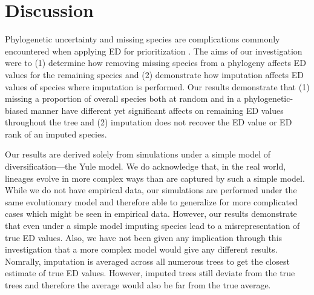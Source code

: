 \documentclass[12pt,english]{article}
\begin{document}
\section*{Discussion}
Phylogenetic uncertainty and missing species are complications commonly
encountered when applying ED for prioritization \autocite{Isaac2007}. The aims
of our investigation were to (1) determine how removing missing species from a
phylogeny affects ED values for the remaining species and (2) demonstrate how
imputation affects ED values of species where imputation is performed. Our
results demonstrate that (1) missing a proportion of overall species both at
random and in a phylogenetic-biased manner have different yet significant
affects on remaining ED values throughout the tree and (2) imputation does not
recover the ED value or ED rank of an imputed species.

Our results are derived solely from simulations under a simple model of
diversification---the Yule model. We do acknowledge that, in the real world,
lineages evolve in more complex ways than are captured by such a simple model.
While we do not have empirical data, our simulations are performed under the
same evolutionary model and therefore able to generalize for more complicated
cases which might be seen in empirical data. However, our results demonstrate
that even under a simple model imputing species lead to a misrepresentation of
true ED values.  Also, we have not been given any implication through this
investigation that a more complex model would give any different results.
Nomrally, imputation is averaged across all numerous trees to get the
closest estimate of true ED values. However, imputed trees still
deviate from the true trees and therefore the average would also be
far from the true average.
\end{document}

